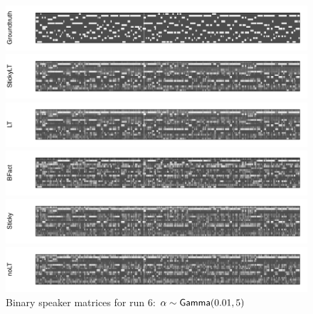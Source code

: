 \begin{figure}[tb]
\begin{center}
  \centerline{\includegraphics[width = \textwidth, height = 0.2\textwidth]{fig/cocktail/synth_s16_m12/hyper_alpha/h10.0_nocs_cp0/a0p01b5/groundtruth.pdf}}
  \centerline{\includegraphics[width = \textwidth, height = 0.2\textwidth]{fig/cocktail/synth_s16_m12/hyper_alpha/h10.0_nocs_cp0/a0p01b5/StickyLT_hdp_hmm_w0_aalpha0p01_balpha5/binary_state.pdf}}
  \centerline{\includegraphics[width = \textwidth, height = 0.2\textwidth]{fig/cocktail/synth_s16_m12/hyper_alpha/h10.0_nocs_cp0/a0p01b5/LT_hdp_hmm_w0_aalpha0p01_balpha5/binary_state.pdf}}
  \centerline{\includegraphics[width = \textwidth, height = 0.2\textwidth]{fig/cocktail/synth_s16_m12/hyper_alpha/h10.0_nocs_cp0/a0p01b5/BFact_hmm_w0_aalpha0p01_balpha5/binary_state.pdf}}
  \centerline{\includegraphics[width = \textwidth, height = 0.2\textwidth]{fig/cocktail/synth_s16_m12/hyper_alpha/h10.0_nocs_cp0/a0p01b5/Sticky_hdp_hmm_w0_aalpha0p01_balpha5/binary_state.pdf}}
  \centerline{\includegraphics[width = \textwidth, height = 0.2\textwidth]{fig/cocktail/synth_s16_m12/hyper_alpha/h10.0_nocs_cp0/a0p01b5/noLT_hdp_hmm_w0_aalpha0p01_balpha5/binary_state.pdf}}
\caption{Binary speaker matrices for run 6: $\alpha \sim \mathsf{Gamma}(0.01,5)$}
\end{center}
\end{figure}

